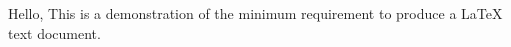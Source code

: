 \documentclass{article}%
\begin{document}

    \noindent Hello, This is a demonstration of the minimum requirement to produce a LaTeX text document. 
\end{document}

